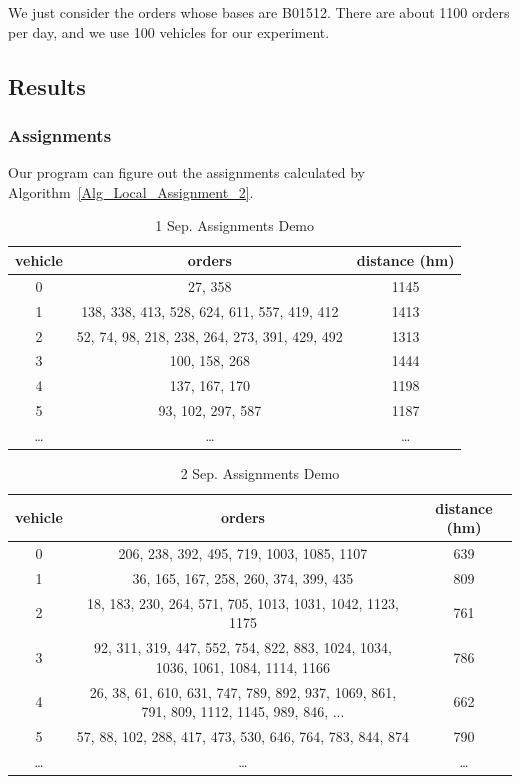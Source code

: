 \documentclass{llncs}
\begin{document}
We just consider the orders whose bases are B01512. There are about 1100 orders per day, and we use 100 vehicles for our experiment.

\subsection{Results}
\subsubsection{Assignments}
Our program can figure out the assignments calculated by Algorithm~\ref{Alg_Local_Assignment_2}.
\begin{table}[H]
  \centering
  \caption{1 Sep. Assignments Demo}
    \begin{tabular}{ccc}
    \toprule
    vehicle & orders & distance (hm) \\
    \midrule
    0     & 27, 358 & 1145 \\
    1     & 138, 338, 413, 528, 624, 611, 557, 419, 412 & 1413 \\
    2     & 52, 74, 98, 218, 238, 264, 273, 391, 429, 492 & 1313 \\
    3     & 100, 158, 268 & 1444 \\
    4     & 137, 167, 170 & 1198 \\
    5     & 93, 102, 297, 587 & 1187 \\
    …     & …     & … \\
    \bottomrule
    \end{tabular}%
  \label{tab:1 Sep. Assignments Demo}%
\end{table}%

\begin{table}[H]
  \centering
  \caption{2 Sep. Assignments Demo}
    \begin{tabular}{ccc}
    \toprule
    vehicle & orders & distance (hm) \\
    \midrule
    0     & 206, 238, 392, 495, 719, 1003, 1085, 1107 & 639 \\
    1     & 36, 165, 167, 258, 260, 374, 399, 435 & 809 \\
    2     & 18, 183, 230, 264, 571, 705, 1013, 1031, 1042, 1123, 1175 & 761 \\
    3     & 92, 311, 319, 447, 552, 754, 822, 883, 1024, 1034, 1036, 1061, 1084, 1114, 1166 & 786 \\
    4     & 26, 38, 61, 610, 631, 747, 789, 892, 937, 1069, 861, 791, 809, 1112, 1145, 989, 846, ... & 662 \\
    5     & 57, 88, 102, 288, 417, 473, 530, 646, 764, 783, 844, 874 & 790 \\
    …     & …     & … \\
    \bottomrule
    \end{tabular}%
  \label{tab:2 Sep. Assignments Demo}%
\end{table}%
\end{document}

